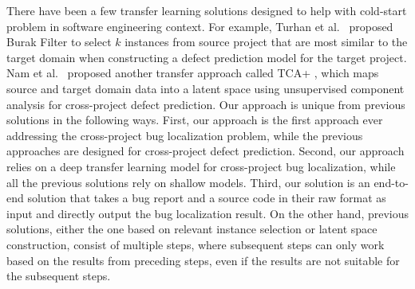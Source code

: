 
There have been a few transfer learning solutions designed to help with cold-start problem in software engineering context. For example, Turhan et al.~\cite{TurhanMBS09} proposed Burak Filter to select $k$ instances from source project that are most similar to the target domain when constructing a defect prediction model for the target project. Nam et al.~\cite{Nam2013transfer} proposed another transfer approach called TCA+ , which maps source and target domain data into a latent space using unsupervised component analysis for cross-project defect prediction. Our approach is unique from previous solutions in the following ways. First, our approach is the first approach ever addressing the cross-project bug localization problem, while the previous approaches are designed for cross-project defect prediction. Second, our approach relies on a deep transfer learning model \TRANPCNN for cross-project bug localization, while all the previous solutions rely on shallow models. Third, our solution is an end-to-end solution that takes a bug report and a source code in their raw format as input and directly output the bug localization result. On the other hand, previous solutions, either the one based on relevant instance selection or latent space construction, consist of multiple steps, where subsequent steps can only work based on the results from preceding steps, even if the results are not suitable for the subsequent steps. 




